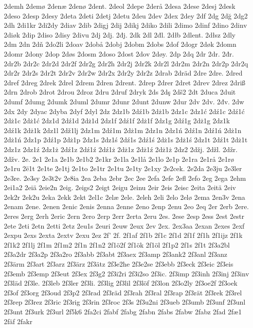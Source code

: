 2demh
2demø
2denæ
2denø
2dent.
2deol
2depe
2derå
2desa
2dese
2desj
2desk
2deso
2desp
2desy
2deta
2deti
2detj
2detu
2deu
2dev
2dex
2dey
2df
2dg
2dğ
2dg2
2dh
2di1kr
2di2dy
2diav
2dib
2digj
2dij
2dikj
2diko
2dili
2dimo
2dinf
2dino
2dinv
2diøk
2dip
2diso
2disy
2divu
2dj
2dj.
2đj.
2dk
2dl
2đl.
2dłb
2dlent.
2dłsz
2dly
2dm
2dn
2dň
2do2li
2doav
2dobå
2dobj
2dobm
2dobs
2dof
2dogr
2døk
2domn
2domr
2dony
2dop
2døs
2dosm
2doso
2dost
2dov
2døy.
2dp
2dq
2dr
2dr.
2đr.
2dr2b
2dr2c
2dr2d
2dr2f
2dr2g
2dr2h
2dr2j
2dr2k
2dr2l
2dr2m
2dr2n
2dr2p
2dr2q
2dr2r
2dr2s
2dr2t
2dr2v
2dr2w
2dr2x
2dr2y
2dr2z
2drab
2dräd
2dre
2dre.
2dred
2dref
2dreg
2drek
2drel
2drem
2dren
2drent.
2drep
2drer
2dret
2drev
2drez
2driß
2drn
2drob
2drot
2drou
2droz
2dru
2druf
2dryk
2ds
2dş
2dš2
2dt
2duca
2duit
2dumf
2dumg
2dumk
2duml
2dumr
2dunr
2dunt
2dunw
2dur
2dv
2dv.
2đv.
2dw
2dx
2dy
2dyac
2dyba
2dyf
2dyl
2dz
2dz1b
2dź1b
2dż1b
2dz1c
2dz1ć
2dź1c
2dź1ć
2dż1c
2dż1ć
2dz1d
2dź1d
2dż1d
2dz1f
2dź1f
2dż1f
2dz1g
2dź1g
2dż1g
2dz1k
2dź1k
2dż1k
2dz1l
2dž1lj
2dz1m
2dź1m
2dż1m
2dz1n
2dz1ń
2dź1n
2dź1ń
2dż1n
2dż1ń
2dz1p
2dź1p
2dż1p
2dz1s
2dz1ś
2dź1s
2dź1ś
2dż1s
2dż1ś
2dz1t
2dź1t
2dż1t
2dz1z
2dz1ź
2dz1ż
2dź1z
2dź1ź
2dź1ż
2dż1z
2dż1ź
2dż1ż
2dz2
2džj.
2džl.
2džr.
2džv.
2e.
2e1
2e1a
2e1b
2e1b2
2e1kr
2e1la
2e1lå
2e1lo
2e1p
2e1ra
2e1rå
2e1rø
2e1ru
2ë1t
2e1te
2e1tj
2e1to
2e1tr
2e1tu
2e1ty
2e1xy
2e2cek.
2e2da
2e3ju
2e3ler
2e3re.
2e3sy
2e3t2v
2e8ia
2ea
2eba
2ebr
2ec
2ee
2efa
2efe
2efl
2efo
2eg
2ega
2ehm
2ei1a2
2eiä
2eie2n
2eig.
2eigs2
2eigt
2eigu
2einu
2eir
2eis
2eisc
2eita
2eitä
2eiv
2ek2r
2ek2u
2eka
2ekk
2ekt
2el1c
2elæ
2ele.
2eleh
2eli
2elo
2elø
2ema
2en3v
2ena
2enam
2ene.
2enen
2enic
2enis
2enna
2enne
2eno
2enp
2enu
2eo
2eq
2er
2erb
2ere.
2eres
2erg
2erh
2eric
2ern
2ero
2erp
2err
2erta
2eru
2es.
2ese
2esp
2ess
2est
2estr
2ete
2eti
2etn
2etti
2etz
2eu1s
2euri
2euw
2eux
2ev
2ex.
2ex3aa
2exan
2exes
2exf
2expu
2exs
2exta
2extv
2exu
2ez
2f'
2f.
2f1af
2f1b
2f1c
2f1d
2f1f
2f1h
2f1ijz
2f1k
2f1k2
2f1lj
2f1m
2f1m2
2f1n
2f1n2
2f1ö2f
2f1ök
2f1öl
2f1p2
2f1s
2f1t
2f3a2bl
2f3a2dr
2f3a2p
2f3a2ro
2f3abb
2f3abt
2f3aex
2f3amp
2f3ank2
2f3anl
2f3anz
2f3ärm
2f3art
2f3arz
2f3ärz
2f3ätz
2f3e2he
2f3e2se
2f3ebb
2f3eck
2f3eic
2f3eis
2f3emb
2f3emp
2f3eut
2f3ex
2f3g2
2f3i2ri
2f3i2so
2f3ic.
2f3imp
2f3inh
2f3inj
2f3inv
2f3läd
2f3le.
2f3leb
2f3ler
2f3li.
2f3lig
2f3lil
2f3löf
2f3lon
2f3o2ly
2f3oe2f
2f3oek
2f3of
2f3org
2f3oud
2f3p2
2f3rad
2f3räd
2f3rah
2f3ral
2f3rap
2f3rät
2f3rek
2f3rel
2f3rep
2f3rez
2f3ric
2f3rig
2f3rin
2f3roc
2f3s
2f3u2ni
2f3ueb
2f3umb
2f3unf
2f3unl
2f3unt
2f3urk
2f3url
2f5k6
2fa2ci
2fabf
2fabg
2fabn
2fabs
2fabw
2fabz
2fad
2fæ1
2fäf
2fakr
